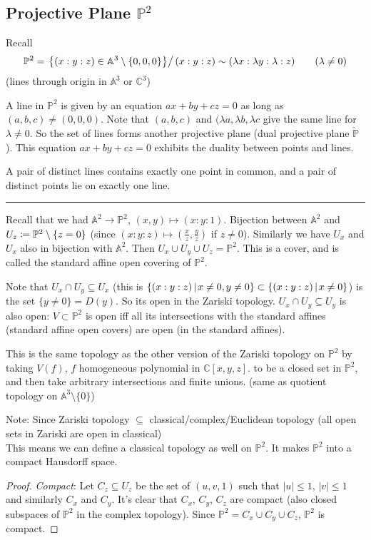 \documentclass [letterpaper,11pt,twoside] {article}
\begin{document}
  \subsection{Projective Plane \texorpdfstring{$\mathbb P^2$}{P\^{}2}}
    Recall
    $$\mathbb P^2 = \left.\mathset{(x:y:z) \in \mathbb A^3\setminus\{0,0,0\}} \right/ (x:y:z) \sim (\lambda x:\lambda y:\lambda:z)\qquad (\lambda \ne 0)$$
    (lines through origin in $\mathbb A^3$ or $\mathbb C^3$)

    A line in $\mathbb P^2$ is given by an equation $ax + by + cz = 0$ as long as $(a,b,c) \ne (0,0,0)$.  Note that $(a, b, c)$ and $(\lambda a, \lambda b, \lambda c$ give the same line for $\lambda \ne 0$.
    So the set of lines forms another projective plane (dual projective plane $\check{\mathbb P}$).
    This equation $ax + by + cz = 0$ exhibits the duality between points and lines.

    \begin{lem*}
      A pair of distinct lines contains exactly one point in common, and a pair of distinct points lie on exactly one line.
    \end{lem*}
    \hrule
    Recall that we had $\mathbb A^2 \to \mathbb P^2$, $(x, y) \mapsto (x:y:1)$.
    Bijection between $\mathbb A^2$ and $U_z\coloneqq \mathbb P^2\setminus \{z = 0\}$ (since $(x:y:z) \mapsto \left(\frac xz, \frac yz\right)$ if $z\ne 0$).
    Similarly we have $U_x$ and $U_x$ also in bijection with $\mathbb A^2$.  Then $U_x\cup U_y \cup U_z = \mathbb P^2$.  This is a cover, and is called the standard affine open covering of $\mathbb P^2$.

    Note that $U_x \cap U_y \subseteq U_x$ (this is $\mathset[(x:y:z)]{x\ne 0, y\ne 0} \subset \mathset[(x:y:z)]{x\ne 0}$) is the set $\{y \ne 0\} = D(y)$.  So its open in the Zariski topology.  $U_x \cap U_y \subseteq U_y$ is also open: $V \subset \mathbb P^2$ is open iff all its intersections with the standard affines (standard affine open covers) are open (in the standard affines).

    This is the same topology as the other version of the Zariski topology on $\mathbb P^2$ by taking $V(f)$, $f$ homogeneous polynomial in $\mathbb C[x,y,z]$. to be a closed set in $\mathbb P^2$, and then take arbitrary intersections and finite unions.  (same as quotient topology on $\mathbb A^3 \setminus \{0\}$)

    Note: Since Zariski topology $\subseteq$ classical/complex/Euclidean topology (all open sets in Zariski are open in classical) \\
    This means we can define a classical topology as well on $\mathbb P^2$.  It makes $\mathbb P^2$ into a compact Hausdorff space. \\
    \begin{proof}
      \emph{Compact}: Let $C_z \subseteq U_z$ be the set of $(u, v, 1)$ such that $|u| \le 1$, $|v| \le 1$ and similarly $C_x$ and $C_y$.  It's clear that $C_x$, $C_y$, $C_z$ are compact (also closed subspaces of $\mathbb P^2$ in the complex topology).  Since $\mathbb P^2 = C_x \cup C_y \cup C_z$, $\mathbb P^2$ is compact.
    \end{proof}
\end{document}
